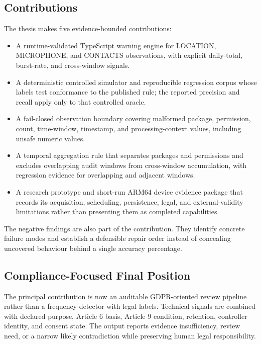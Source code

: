 \subsection{Contributions}

The thesis makes five evidence-bounded contributions:

\begin{itemize}
    \item A runtime-validated TypeScript warning engine for LOCATION, MICROPHONE, and CONTACTS observations, with explicit daily-total, burst-rate, and cross-window signals.
    \item A deterministic controlled simulator and reproducible regression corpus whose labels test conformance to the published rule; the reported precision and recall apply only to that controlled oracle.
    \item A fail-closed observation boundary covering malformed package, permission, count, time-window, timestamp, and processing-context values, including unsafe numeric values.
    \item A temporal aggregation rule that separates packages and permissions and excludes overlapping audit windows from cross-window accumulation, with regression evidence for overlapping and adjacent windows.
    \item A research prototype and short-run ARM64 device evidence package that records its acquisition, scheduling, persistence, legal, and external-validity limitations rather than presenting them as completed capabilities.
\end{itemize}

The negative findings are also part of the contribution. They identify concrete failure modes and establish a defensible repair order instead of concealing uncovered behaviour behind a single accuracy percentage.

\subsection{Compliance-Focused Final Position}

The principal contribution is now an auditable GDPR-oriented review pipeline rather than a frequency detector with legal labels. Technical signals are combined with declared purpose, Article 6 basis, Article 9 condition, retention, controller identity, and consent state. The output reports evidence insufficiency, review need, or a narrow likely contradiction while preserving human legal responsibility.


